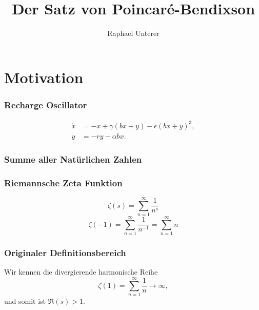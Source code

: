 \documentclass[ngerman, aspectratio=169]{beamer}
\title{Der Satz von Poincaré-Bendixson}
\author{Raphael Unterer}
\institute{Mathematisches Seminar 2025: Felder}
\begin{document}
	\begin{frame}
		\titlepage
	\end{frame}

	\section{Motivation}

    \begin{frame}
        \frametitle{Recharge Oscillator}
        \begin{align*}
            \dot{x} &= -x + \gamma \left(bx + y\right) - \epsilon \left(bx + y\right)^3, \\
            \dot{y} &= -ry - \alpha b x.
        \end{align*}
    \end{frame}
    \begin{frame}
        \frametitle{Summe aller Natürlichen Zahlen}
    \end{frame}
    \begin{frame}
        \frametitle{Riemannsche Zeta Funktion}
        \begin{equation*}
            \zeta(s)
            =
            \sum_{n=1}^{\infty}
            \frac{1}{n^s}
        \end{equation*}
        \pause
        \begin{equation*}
            \zeta(-1)
            =
            \sum_{n=1}^{\infty}
            \frac{1}{n^{-1}}
            =
            \sum_{n=1}^{\infty} n
        \end{equation*}
    \end{frame}
    \begin{frame}
        \frametitle{Originaler Definitionsbereich}
        Wir kennen die divergierende harmonische Reihe
        \begin{equation*}
            \zeta(1)
            =
            \sum_{n=1}^{\infty}
            \frac{1}{n}
            \rightarrow
            \infty,
        \end{equation*}
        und somit ist $\Re(s) > 1$.
    \end{frame}
\end{document}
